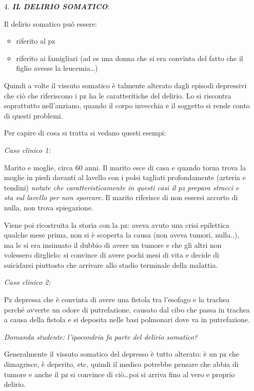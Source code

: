 \begin{itemize}
\item[4.]
  \textbf{\emph{IL DELIRIO SOMATICO}}:

Il delirio somatico può essere:

\begin{itemize}
\item
  riferito al pz
\item
  riferito ai famigliari (ad es una donna che si era convinta del fatto
  che il figlio avesse la leucemia\ldots{})
\end{itemize}

Quindi a volte il vissuto somatico è talmente alterato dagli episodi
depressivi che ciò che riferiscono i pz ha le caratteritiche del
delirio. Lo si riscontra soprattutto nell'anziano, quando il corpo
invecchia e il soggetto si rende conto di questi problemi.

Per capire di cosa si tratta si vedano questi esempi:

\emph{Caso clinico 1:}

Marito e moglie, circa 60 anni. Il marito esce di casa e quando torna
trova la moglie in piedi davanti al lavello con i polsi tagliati
profondamente (arteria e tendini) \emph{notate che caratteristicamente
in questi casi il pz prepara stracci e sta sul lavello per non
sporcare}. Il marito riferisce di non essersi accorto di nulla, non
trova spiegazione.

Viene poi ricostruita la storia con la pz: aveva avuto una crisi
epilettica qualche mese prima, non si è scoperta la causa (non aveva
tumori, nulla..), ma le si era insinuato il dubbio di avere un tumore e
che gli altri non volessero dirglielo: si convince di avere pochi mesi
di vita e decide di suicidarsi piuttosto che arrivare allo stadio
terminale della malattia.

\emph{Caso clinico 2:}

Pz depressa che è convinta di avere una fistola tra l'esofago e la
trachea perché avverte un odore di putrefazione, causato dal cibo che
passa in trachea a causa della fistola e si deposita nelle basi
polmonari dove va in putrefazione.

\emph{Domanda studente: l'ipocondria fa parte del delirio somatico?}

Generalmente il vissuto somatico del depresso è tutto alterato: è un pz
che dimagrisce, è deperito, etc, quindi il medico potrebbe pensare che
abbia di tumore e anche il pz si convince di ciò\ldots{}poi si arriva
fino al vero e proprio delirio.
\end{itemize}


